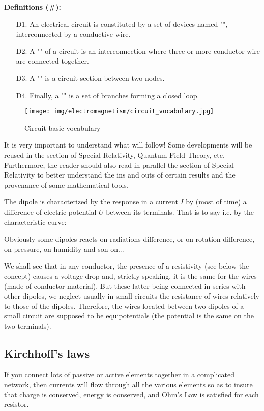 	\textbf{Definitions (\#\mydef):}
	\begin{enumerate}
		\item[D1.] An electrical circuit is constituted by a set of devices named "", interconnected by a conductive wire.
		
		\item[D2.] A "" of a circuit is an interconnection where three or more conductor wire are connected together.
		
		\item[D3.] A "" is a circuit section between two nodes.
		
		\item[D4.] Finally, a "" is a set of branches forming a closed loop.
	\end{enumerate}
	\begin{figure}[H]
		\centering
		\texttt{[image: img/electromagnetism/circuit\_vocabulary.jpg]}
		\caption{Circuit basic vocabulary}
	\end{figure}
	\begin{tcolorbox}[title=Remark,colframe=black,arc=10pt]
	It is very important to understand what will follow! Some developments will be reused in the section of Special Relativity, Quantum Field Theory, etc. Furthermore, the reader should also read in parallel the section of Special Relativity to better understand the ins and outs of certain results and the provenance of some mathematical tools.
	\end{tcolorbox}
	The dipole is characterized by the response in a current $I$ by (most of time) a difference of electric potential $U$ between its terminals. That is to say i.e. by the characteristic curve:
	
	Obviously some dipoles reacts on radiations difference, or on rotation difference, on pressure, on humidity and son on...
	
	We shall see that in any conductor, the presence of a resistivity (see below the concept) causes a voltage drop and, strictly speaking, it is the same for the wires (made of conductor material). But these latter being connected in series with other dipoles, we neglect usually in small circuits the resistance of wires relatively to those of the dipoles. Therefore, the wires located between two dipoles of a small circuit are supposed to be equipotentials (the potential is the same on the two terminals).
	
	\subsection{Kirchhoff's laws}
	If you connect lots of passive or active elements together in a complicated network, then currents will flow through all the various elements so as to insure that charge is conserved, energy is conserved, and Ohm's Law is satisfied for each resistor.
	
